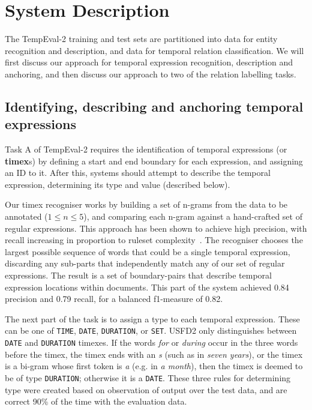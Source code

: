 \documentclass[11pt]{article}
\begin{document}
\section{System Description}
\label{description}
The TempEval-2 training and test sets are partitioned into data for entity recognition and description, and data for temporal relation classification. We will first discuss our approach for temporal expression recognition, description and anchoring, and then discuss our approach to two of the relation labelling tasks.

\subsection{Identifying, describing and anchoring temporal expressions}
\label{timex}
Task A of TempEval-2 requires the identification of temporal expressions (or {\bf timex}s) by defining a start and end boundary for each expression, and assigning an ID to it. After this, systems should attempt to describe the temporal expression, determining its type and value (described below).

Our timex recogniser works by building a set of n-grams from the data to be annotated ($1 \leq n \leq 5$), and comparing each n-gram against a hand-crafted set of regular expressions. This approach has been shown to achieve high precision, with recall increasing in proportion to ruleset complexity~\cite{han2006language,mani2000robust,ahn2005towards}. The recogniser chooses the largest possible sequence of words that could be a single temporal expression, discarding any sub-parts that independently match any of our set of regular expressions. The result is a set of boundary-pairs that describe temporal expression locations within documents. This part of the system achieved 0.84 precision and 0.79 recall, for a balanced f1-measure of 0.82.

The next part of the task is to assign a type to each temporal expression. These can be one of {\tt TIME}, {\tt DATE}, {\tt DURATION}, or {\tt SET}. USFD2 only distinguishes between {\tt DATE} and {\tt DURATION} timexes. If the words \emph{for} or \emph{during} occur in the three words before the timex, the timex ends with an {\emph s} (such as in \emph{seven years}), or the timex is a bi-gram whose first token is {\emph a} (e.g. in \emph{a month}), then the timex is deemed to be of type {\tt DURATION}; otherwise it is a {\tt DATE}. These three rules for determining type were created based on observation of output over the test data, and are correct 90\% of the time with the evaluation data.
\end{document}
